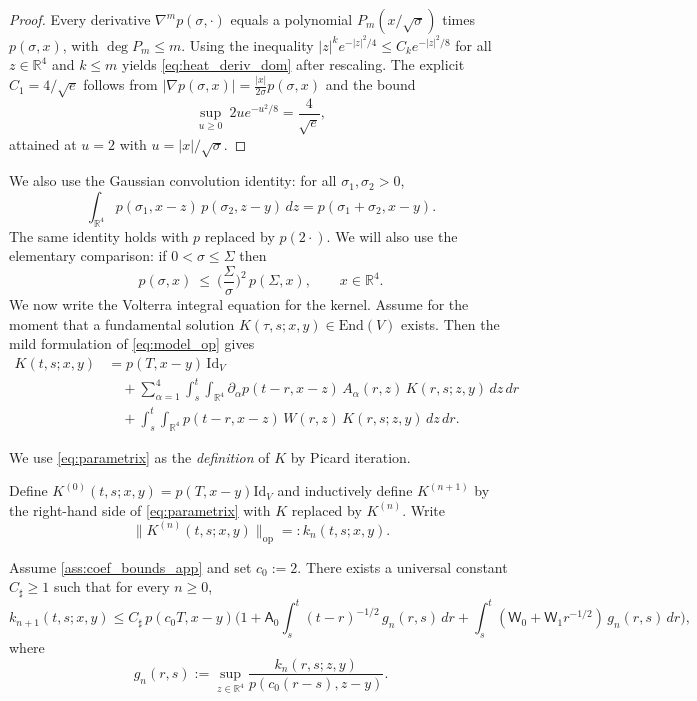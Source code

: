 \begin{proof}
Every derivative $\nabla^m p(\sigma,\cdot)$ equals a polynomial $P_m(x/\sqrt{\sigma})$ times $p(\sigma,x)$, with $\deg P_m\le m$.
Using the inequality $|z|^k e^{-|z|^2/4}\le C_k e^{-|z|^2/8}$ for all $z\in\mathbb R^4$ and $k\le m$
yields \eqref{eq:heat_deriv_dom} after rescaling.
The explicit $C_1=4/\sqrt{e}$ follows from $|\nabla p(\sigma,x)|=\frac{|x|}{2\sigma}p(\sigma,x)$ and the bound
\[
\sup_{u\ge 0}\ 2u e^{-u^2/8}=\frac{4}{\sqrt e},
\]
attained at $u=2$ with $u=|x|/\sqrt{\sigma}$.
\end{proof}

We also use the Gaussian convolution identity: for all $\sigma_1,\sigma_2>0$,
\begin{equation}\label{eq:gauss_conv}
\int_{\mathbb R^4} p(\sigma_1,x-z)\,p(\sigma_2,z-y)\,dz = p(\sigma_1+\sigma_2,x-y).
\end{equation}
The same identity holds with $p$ replaced by $p(2\cdot)$.
We will also use the elementary comparison: if $0<\sigma\le\Sigma$ then
\begin{equation}\label{eq:gauss_compare}
p(\sigma,x)\ \le\ \Big(\frac{\Sigma}{\sigma}\Big)^2\,p(\Sigma,x),\qquad x\in\mathbb R^4.
\end{equation}
We now write the Volterra integral equation for the kernel.
Assume for the moment that a fundamental solution $K(\tau,s;x,y)\in \mathrm{End}(V)$ exists.
Then the mild formulation of \eqref{eq:model_op} gives
\begin{equation}\label{eq:parametrix}
\begin{aligned}
K(t,s;x,y)
&= p(T,x-y)\,\mathrm{Id}_V \\
&\quad +\sum_{\alpha=1}^4\int_s^t\!\!\int_{\mathbb R^4}\partial_\alpha p(t-r,x-z)\,A_\alpha(r,z)\,K(r,s;z,y)\,dz\,dr \\
&\quad +\int_s^t\!\!\int_{\mathbb R^4} p(t-r,x-z)\,W(r,z)\,K(r,s;z,y)\,dz\,dr.
\end{aligned}
\end{equation}

We use \eqref{eq:parametrix} as the \emph{definition} of $K$ by Picard iteration.

Define $K^{(0)}(t,s;x,y)=p(T,x-y)\mathrm{Id}_V$ and inductively define $K^{(n+1)}$ by the right-hand side of \eqref{eq:parametrix}
with $K$ replaced by $K^{(n)}$.
Write
\[
\|K^{(n)}(t,s;x,y)\|_{\mathrm{op}}=:k_n(t,s;x,y).
\]

\begin{lemma}\label{lem:volterra_maj}
Assume \ref{ass:coef_bounds_app} and set $c_0:=2$.
There exists a universal constant $C_\sharp\ge 1$ such that for every $n\ge 0$,
\[
 k_{n+1}(t,s;x,y)
 \le
 C_\sharp\,p(c_0T,x-y)\Big(1
 + \mathsf A_0\int_s^t (t-r)^{-1/2}\,g_n(r,s)\,dr
 + \int_s^t (\mathsf W_0+\mathsf W_1 r^{-1/2})\,g_n(r,s)\,dr\Big),
\]
where
\[
 g_n(r,s):=\sup_{z\in\mathbb R^4}\frac{k_n(r,s;z,y)}{p(c_0(r-s),z-y)}.
\]
\end{lemma}

